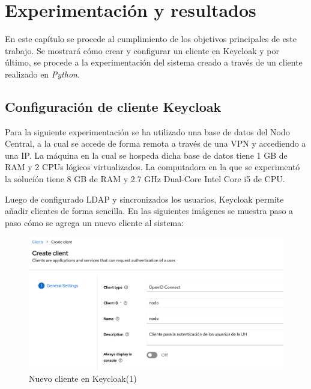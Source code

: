 \chapter{Experimentación y resultados}\label{chapter:experimentation}

En este capítulo se procede al cumplimiento de los objetivos principales de este trabajo. Se mostrará cómo crear y configurar un cliente en Keycloak y por último, se procede a la experimentación del sistema creado a través de un cliente realizado en \textit{Python}.

\section{Configuración de cliente Keycloak} \label{config-client}
 
%
%

Para la siguiente experimentación se ha utilizado una base de datos del Nodo Central, a la cual se accede de forma remota a través de una VPN y accediendo a una IP. La máquina en la cual se hospeda dicha base de datos tiene 1 GB de RAM y 2 CPUs lógicos virtualizados. La computadora en la que se experimentó la solución tiene 8 GB de RAM y 2.7 GHz Dual-Core Intel Core i5 de CPU.

 Luego de configurado LDAP y sincronizados los usuarios, Keycloak permite añadir clientes de forma sencilla. En las siguientes imágenes se muestra paso a paso cómo se agrega un nuevo cliente al sistema:

\begin{figure}[H]
	\centering
	\includegraphics[width=1\linewidth]{Graphics/client_new1}
	\caption{Nuevo cliente en Keycloak(1)}
	\label{fig:clientnew1}
\end{figure}

